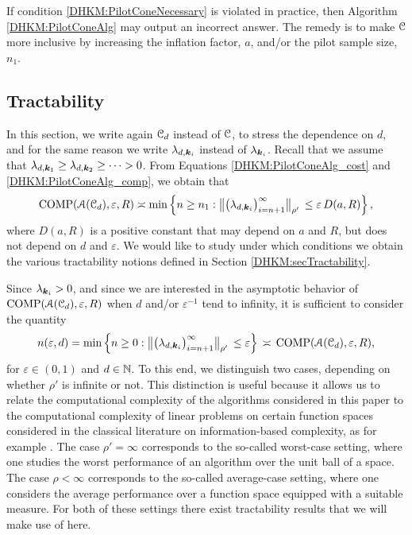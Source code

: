 \documentclass[USenglish]{article}
\theoremstyle{dgthm}
\theoremstyle{dgthm}
\theoremstyle{dgthm}
\theoremstyle{dgthm}
\theoremstyle{dgdef}
\theoremstyle{definition}
\DeclareMathOperator{\COMP}{COMP}
\newcommand{\bignorm}[2][{}]{\ensuremath{\bigl \lVert #2 \bigr \rVert}_{#1}}
\begin{document}
If condition \eqref{DHKM:PilotConeNecessary} is violated in practice, then Algorithm \ref{DHKM:PilotConeAlg} may output an incorrect answer.  The remedy is to make ${\mathcal{C}}$ more inclusive by increasing the inflation factor, $a$, and/or the pilot sample size, $n_1$.



\subsection{Tractability}\label{DHKM:SecPilotTract}

In this section, we write again ${\mathcal{C}}_d$ instead of ${\mathcal{C}}$, to stress the dependence on $d$, and for the same reason we write $\lambda_{d,{\boldsymbol{k}}_i}$ instead of $\lambda_{{\boldsymbol{k}}_i}$. Recall that we assume that 
$\lambda_{d,{\boldsymbol{k}}_1}\geq \lambda_{d,{\boldsymbol{k}}_2}\geq \cdots >0$. From 
Equations \eqref{DHKM:PilotConeAlg_cost} and \eqref{DHKM:PilotConeAlg_comp}, we obtain that 
\[
        \COMP(\calA(\calC_d),\varepsilon,R)  \asymp \min \left \{n \ge n_1 : \bignorm[\rho']{\bigl(  \lambda_{d,\bsk_i}  \bigr)_{i = n+1}^{\infty}} \,
    \le \varepsilon\, D(a,R) \right \},
\]
where $D(a,R)$ is a positive constant that may depend on $a$ and $R$, but does not depend on $d$ and $\varepsilon$. We would like to study under which conditions we obtain the various tractability notions defined in Section \ref{DHKM:secTractability}. 

Since $\lambda_{{\boldsymbol{k}}_i}>0$, and since we are interested in the asymptotic behavior 
of $\COMP(\calA(\calC_d),\varepsilon,R)$ when $d$ and/or $\varepsilon^{-1}$ tend to infinity, it is sufficient to consider the quantity 
\[
n(\varepsilon,d)=\min \left \{n\ge 0: \bignorm[\rho']{\bigl(  \lambda_{d,\bsk_i}  \bigr)_{i = n+1}^{\infty}} \,
    \le \varepsilon \right \}\,\asymp\,\COMP(\calA(\calC_d),\varepsilon,R) ,
\]
for $\varepsilon \in (0,1)$ and $d\in{\mathbb{N}}$.
To this end, we distinguish two cases, depending on whether $\rho'$ is infinite or not. This 
distinction is useful because it allows us to relate the computational complexity of the algorithms 
considered in this paper to the computational complexity of linear problems on certain function spaces considered in the classical literature on information-based complexity, as for example \cite{NovWoz08a}. The case $\rho'=\infty$ corresponds to the so-called 
worst-case setting, where one studies the worst performance of an algorithm over the unit ball of 
a space. The case $\rho<\infty$ corresponds to the so-called average-case setting, where one 
considers the average performance over a function space equipped with a suitable measure. 
For both of these settings there exist tractability results that we will make use of here.
\end{document}
